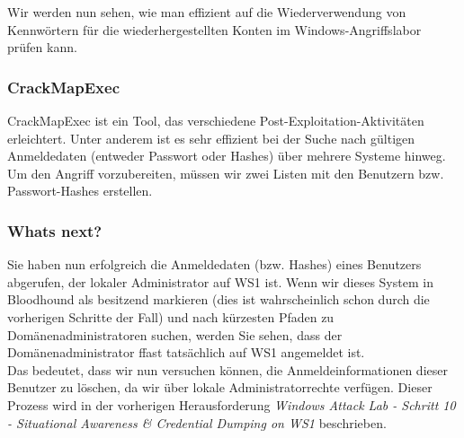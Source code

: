 Wir werden nun sehen, wie man effizient auf die Wiederverwendung von Kennwörtern für die wiederhergestellten Konten im Windows-Angriffslabor prüfen kann.

\subsubsection{CrackMapExec}
CrackMapExec ist ein Tool, das verschiedene Post-Exploitation-Aktivitäten erleichtert. Unter anderem ist es sehr effizient bei der Suche nach gültigen Anmeldedaten (entweder Passwort oder Hashes) über mehrere Systeme hinweg.\\
Um den Angriff vorzubereiten, müssen wir zwei Listen mit den Benutzern bzw. Passwort-Hashes erstellen.

\subsubsection{Whats next?}
Sie haben nun erfolgreich die Anmeldedaten (bzw. Hashes) eines Benutzers abgerufen, der lokaler Administrator auf WS1 ist. Wenn wir dieses System in Bloodhound als besitzend markieren (dies ist wahrscheinlich schon durch die vorherigen Schritte der Fall) und nach kürzesten Pfaden zu Domänenadministratoren suchen, werden Sie sehen, dass der Domänenadministrator ffast tatsächlich auf WS1 angemeldet ist.\\

Das bedeutet, dass wir nun versuchen können, die Anmeldeinformationen dieser Benutzer zu löschen, da wir über lokale Administratorrechte verfügen. Dieser Prozess wird in der vorherigen Herausforderung \textit{Windows Attack Lab - Schritt 10 - Situational Awareness \& Credential Dumping on WS1} beschrieben.